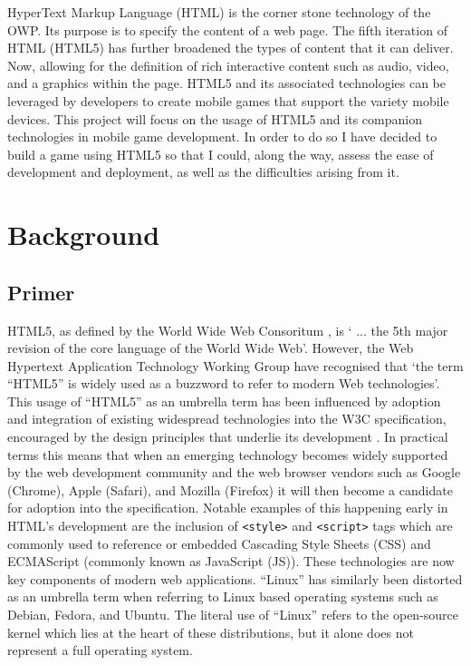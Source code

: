 \documentclass[final]{cmpreport}
\begin{document}
HyperText Markup Language (HTML) is the corner stone technology of the OWP. Its purpose is to specify the content of a web page. The fifth iteration of HTML (HTML5) has further broadened the types of content that it can deliver. Now, allowing for the definition of rich interactive content such as audio, video, and a graphics within the page. HTML5 and its associated technologies can be leveraged by developers to create mobile games that support the variety mobile devices. This project will focus on the usage of HTML5 and its companion technologies in mobile game development. In order to do so I have decided to build a game using HTML5 so that I could, along the way, assess the ease of development and deployment, as well as the difficulties arising from it.

\section{Background}

\subsection{Primer}

HTML5, as defined by the World Wide Web Consoritum \citep{W3C2}, is ` ... the 5th major revision of the core language of the World Wide Web'. However, the Web Hypertext Application Technology Working Group \citep{WHATWG} have recognised that `the term ``HTML5'' is widely used as a buzzword to refer to modern Web technologies'. This usage of ``HTML5'' as an umbrella term has been influenced by adoption and integration of existing widespread technologies into the W3C specification, encouraged by the design principles that underlie its development \citep{Keith}. In practical terms this means that when an emerging technology becomes widely supported by the web development community and the web browser vendors such as Google (Chrome), Apple (Safari), and Mozilla (Firefox) it will then become a candidate for adoption into the specification. Notable examples of this happening early in HTML's development are the inclusion of \texttt{<style>} and \texttt{<script>} tags which are commonly used to reference or embedded Cascading Style Sheets (CSS) and ECMAScript (commonly known as JavaScript (JS)). These technologies are now key components of modern web applications. ``Linux'' has similarly been distorted as an umbrella term when referring to Linux based operating systems such as Debian, Fedora, and Ubuntu. The literal use of ``Linux'' refers to the open-source kernel which lies at the heart of these distributions, but it alone does not represent a full operating system.
\end{document}
